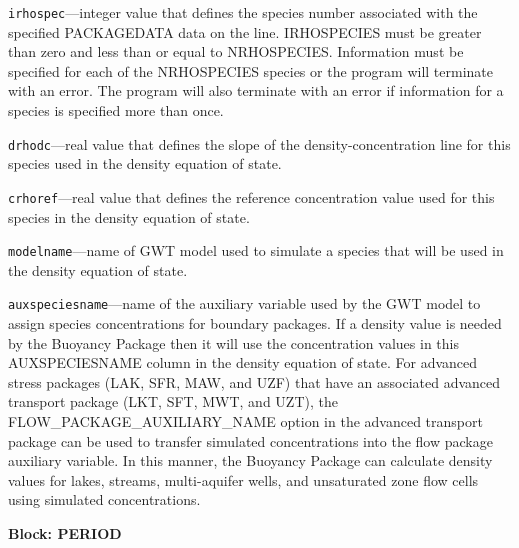 \begin{description}
\item \texttt{irhospec}---integer value that defines the species number associated with the specified PACKAGEDATA data on the line. IRHOSPECIES must be greater than zero and less than or equal to NRHOSPECIES. Information must be specified for each of the NRHOSPECIES species or the program will terminate with an error.  The program will also terminate with an error if information for a species is specified more than once.

\item \texttt{drhodc}---real value that defines the slope of the density-concentration line for this species used in the density equation of state.

\item \texttt{crhoref}---real value that defines the reference concentration value used for this species in the density equation of state.

\item \texttt{modelname}---name of GWT model used to simulate a species that will be used in the density equation of state.

\item \texttt{auxspeciesname}---name of the auxiliary variable used by the GWT model to assign species concentrations for boundary packages.  If a density value is needed by the Buoyancy Package then it will use the concentration values in this AUXSPECIESNAME column in the density equation of state.  For advanced stress packages (LAK, SFR, MAW, and UZF) that have an associated advanced transport package (LKT, SFT, MWT, and UZT), the FLOW\_PACKAGE\_AUXILIARY\_NAME option in the advanced transport package can be used to transfer simulated concentrations into the flow package auxiliary variable.  In this manner, the Buoyancy Package can calculate density values for lakes, streams, multi-aquifer wells, and unsaturated zone flow cells using simulated concentrations.

\end{description}
\item \textbf{Block: PERIOD}

